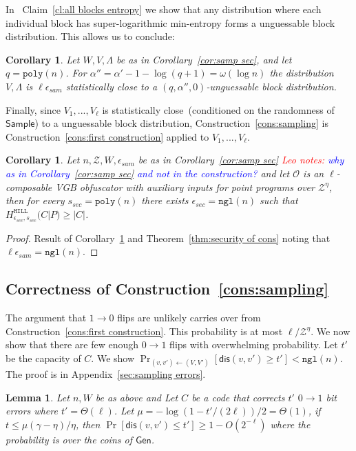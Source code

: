 \documentclass[11pt]{article}
\newcommand{\apref}[1]{\mbox{Appendix~\ref{#1}}}
\newcommand{\thref}[1]{\mbox{Theorem~\ref{#1}}}
\newcommand{\corref}[1]{\mbox{Corollary~\ref{#1}}}
\newcommand{\clref}[1]{\mbox{Claim~\ref{#1}}}
\newcommand{\consref}[1]{\mbox{Construction~\ref{#1}}}
\newcommand{\class}[1]{{\ensuremath{\mathsf{#1}}}}
\newcommand{\gen}{\ensuremath{\class{Gen}}\xspace}
\newcommand{\sample}{\ensuremath{\class{Sample}}\xspace}
\newcommand{\dis}{\ensuremath{\mathsf{dis}}}
\newcommand{\hill}{\ensuremath{\mathtt{HILL}}\xspace}
\newcommand{\poly}{\ensuremath{\mathtt{poly}}\xspace}
\newcommand{\ngl}{\ensuremath{\mathtt{ngl}}\xspace}
\newtheorem{lemma}[theorem]{Lemma}
\newtheorem{corollary}[theorem]{Corollary}
\newcommand{\authnote}[2]{{\textcolor{red}{\textsf{#1 notes: }\textcolor{blue}{ #2}}\marginpar{\textcolor{red}{\textbf{!!!!!}}}}}
\newcommand{\authnote}[2]{}
\newcommand{\lnote}[1]{{\authnote{Leo}{#1}}}
\begin{document}
In ~\clref{cl:all blocks entropy} we show that any distribution where each individual block has super-logarithmic min-entropy forms a unguessable block distribution.  This allows us to conclude:
\begin{corollary}
\label{cor:v are unguessable}
Let $W, V, \Lambda$ be as in \corref{cor:samp sec}, and
let $q = \poly(n)$.  For $\alpha'' =\alpha'-1-\log (q+1) =  \omega(\log n)$ the distribution $V , \Lambda$ is $\ell \epsilon_{sam}$ statistically close to a $(q, \alpha'', 0)$-unguessable block distribution.
\end{corollary}

Finally, since $V_1,..., V_\ell$ is statistically close~(conditioned on the randomness of $\sample$) to a unguessable block distribution, \consref{cons:sampling} is \consref{cons:first construction} applied to $V_1,..., V_\ell$.
\begin{corollary}
\label{cor:samp unguess}
Let $n, \mathcal{Z}, W, \epsilon_{sam}$ be as in \corref{cor:samp sec} \lnote{why as in \corref{cor:samp sec} and not in the construction?} and let $\mathcal{O}$ is an $\ell$-composable VGB obfuscator with auxiliary inputs for point programs over $\mathcal{Z}^\eta$, then for every $s_{sec} = \poly(n)$ there exists $\epsilon_{sec} = \ngl(n)$ such that $H^{\hill}_{\epsilon_{sec}, s_{sec}}(C | P) \geq |C|$. %
\end{corollary}
\begin{proof}
Result of \corref{cor:v are unguessable} and \thref{thm:security of cons} noting that $\ell \epsilon_{sam} = \ngl(n)$.
\end{proof}

\subsection{Correctness of \consref{cons:sampling}}
\label{sec:correct sampling}
The argument that $1\rightarrow 0$ flips are unlikely carries over from \consref{cons:first construction}.  This probability is at most $\ell/\mathcal{Z}^\eta$.  We now show that there are few enough $0\rightarrow 1$ flips with overwhelming probability.  Let $t'$ be the capacity of $C$.  We show $\Pr_{(v, v')\leftarrow (V, V')}[\dis(v, v')\ge t'] <\ngl(n)$.  The proof is in \apref{sec:sampling errors}.

\begin{lemma}
\label{lem:sampling errors}
Let $n, W$ be as above and Let $C$ be a code that corrects $t'$ $0\rightarrow 1$ bit errors where $t' =\Theta(\ell)$.  Let $\mu = -\log(1-t'/(2\ell))/2 = \Theta(1)$, if $t \leq \mu(\gamma - \eta)/\eta$, then $\Pr[\dis(v, v')\leq t']\geq 1-O(2^{-\ell})$ where the probability is over the coins of $\gen$.  %
\end{lemma}
\end{document}
